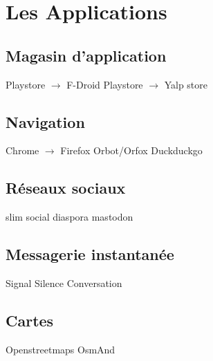 \documentclass[compress]{beamer}
\begin{document}

\section{Les Applications}

\subsection{Magasin d'application}

\begin{frame}
Playstore $\to$ F-Droid\newline
Playstore $\to$ Yalp store
\end{frame}

\subsection{Navigation}
\begin{frame}
Chrome $\to$ Firefox\newline
Orbot/Orfox\newline
Duckduckgo
\end{frame}

\subsection{Réseaux sociaux}
\begin{frame}
slim social\newline
diaspora\newline
mastodon
\end{frame}

\subsection{Messagerie instantanée}
\begin{frame}
Signal\newline
Silence\newline
Conversation
\end{frame}

\subsection{Cartes}
\begin{frame}
Openstreetmaps\newline
OsmAnd
\end{frame}
\end{document}
